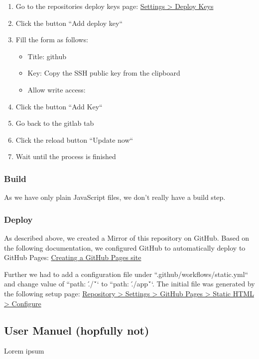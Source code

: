 \begin{enumerate}
    \item Go to the repositories deploy keys page: \href{https://github.com/decibel-threshold-event-displayer/decibel-threshold-event-displayer.github.io/settings/keys}{Settings > Deploy Keys}
    \item Click the button ``Add deploy key``
    \item Fill the form as follows:
    \begin{itemize}
        \item Title: github
        \item Key: Copy the SSH public key from the clipboard
        \item Allow write access:
    \end{itemize}
    \item Click the button ``Add Key``
    \item Go back to the gitlab tab
    \item Click the reload button ``Update now``
    \item Wait until the process is finished
\end{enumerate}

\subsubsection{Build}
As we have only plain JavaScript files, we don't really have a build step.

\subsubsection{Deploy}
As described above, we created a Mirror of this repository on GitHub.
Based on the following documentation, we configured GitHub to automatically deploy to GitHub Pages:
\href{https://docs.github.com/en/pages/getting-started-with-github-pages/creating-a-github-pages-site}{Creating a GitHub Pages site}

Further we had to add a configuration file under ``.github/workflows/static.yml`` and change value of ``path: \'./\'`` to ``path: \'./app\'``.
The initial file was generated by the following setup page:
\href{https://github.com/decibel-threshold-event-displayer/decibel-threshold-event-displayer.github.io/new/main?filename=.github%2Fworkflows%2Fstatic.yml&pages_workflow_template=pages%2Fstatic}{Repository > Settings > GitHub Pages > Static HTML > Configure}


\subsection{User Manuel (hopfully not)}
Lorem ipsum


